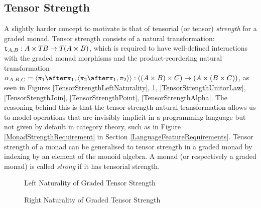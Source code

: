 \documentclass{Report}
\begin{document}
\subsection{Tensor Strength}
A slightly harder concept to motivate is that of tensorial (or tensor) \textit{strength} for a graded monad. Tensor strength consists of a natural transformation: $\texttt{t}_{A, B}: A \times T_{}{B} \rightarrow T_{}{(A \times B)}$, which is required to have well-defined interactions with the graded monad morphisms and the product-reordering natural transformation $\alpha_{A, B, C} = \pr{\p\after\p}{\pr{\pp\after\p}{\pp}}: ((A \times B) \times C) \rightarrow (A \times (B \times C))$, as seen in Figures \ref{TensorStrengthLeftNaturality}, \ref{TensorStrengthRightNaturality}, \ref{TensorStrengthUnitorLaw}, \ref{TensorStengthJoin}, \ref{TensorStrengthPoint}, \ref{TensorStrengthAlpha}. The reasoning behind this is that the tensor-strength natural transformation allows us to model operations that are invisibly implicit in a programming language but not given by default in category theory, such as in Figure \ref{MonadStrengthRequirement} in Section \ref{LanguageFeatureRequirements}. Tensor strength of a monad can be generalised to tensor strength in a graded monad by indexing by an element of the monoid algebra. A monad (or respectively a graded monad) is called \textit{strong} if it has tensorial strength. 

\begin{figure}
\begin{framed}
        \centering
        \begin{minipage}{0.45\textwidth}
            \centering
                \caption{Left Naturality of Graded Tensor Strength}
                \label{TensorStrengthLeftNaturality}
        \end{minipage}
        \hfill
        \begin{minipage}{0.45\textwidth}
            \centering
            \caption{Right Naturality of Graded Tensor Strength}
            \label{TensorStrengthRightNaturality}
        \end{minipage} 
\end{framed}
\end{figure}
\end{document}
